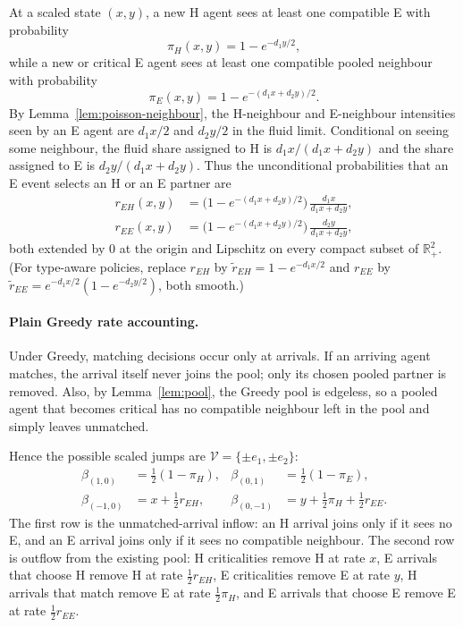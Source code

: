 \documentclass{article}
\theoremstyle{plain}
\theoremstyle{definition}
\begin{document}
At a scaled state $(x,y)$, a new H agent sees at least one compatible E with probability
\[
\pi_H(x,y)=1-e^{-d_1y/2},
\]
while a new or critical E agent sees at least one compatible pooled neighbour with probability
\[
\pi_E(x,y)=1-e^{-(d_1x+d_2y)/2}.
\]
By Lemma~\ref{lem:poisson-neighbour}, the H-neighbour and E-neighbour intensities seen by an E agent are $d_1x/2$ and $d_2y/2$ in the fluid limit. Conditional on seeing some neighbour, the fluid share assigned to H is $d_1x/(d_1x+d_2y)$ and the share assigned to E is $d_2y/(d_1x+d_2y)$. Thus the unconditional probabilities that an E event selects an H or an E partner are
\begin{align*}
r_{EH}(x,y) &= \bigl(1-e^{-(d_1 x+d_2 y)/2}\bigr)\,\frac{d_1 x}{d_1 x+d_2 y},\\
r_{EE}(x,y) &= \bigl(1-e^{-(d_1 x+d_2 y)/2}\bigr)\,\frac{d_2 y}{d_1 x+d_2 y},
\end{align*}
both extended by $0$ at the origin and Lipschitz on every compact subset of $\mathbb{R}_+^2$. (For type-aware policies, replace $r_{EH}$ by $\widetilde r_{EH}=1-e^{-d_1 x/2}$ and $r_{EE}$ by $\widetilde r_{EE}=e^{-d_1 x/2}(1-e^{-d_2 y/2})$, both smooth.)

\paragraph{Plain Greedy rate accounting.}
Under Greedy, matching decisions occur only at arrivals. If an arriving agent matches, the arrival itself never joins the pool; only its chosen pooled partner is removed. Also, by Lemma~\ref{lem:pool}, the Greedy pool is edgeless, so a pooled agent that becomes critical has no compatible neighbour left in the pool and simply leaves unmatched.

Hence the possible scaled jumps are $\mathcal V=\{\pm e_1,\pm e_2\}$:
\begin{align*}
\beta_{(1,0)}&=\tfrac12(1-\pi_H),
&\beta_{(0,1)}&=\tfrac12(1-\pi_E),\\
\beta_{(-1,0)}&=x+\tfrac12 r_{EH},
&\beta_{(0,-1)}&=y+\tfrac12\pi_H+\tfrac12 r_{EE}.
\end{align*}
The first row is the unmatched-arrival inflow: an H arrival joins only if it sees no E, and an E arrival joins only if it sees no compatible neighbour. The second row is outflow from the existing pool: H criticalities remove H at rate $x$, E arrivals that choose H remove H at rate $\tfrac12r_{EH}$, E criticalities remove E at rate $y$, H arrivals that match remove E at rate $\tfrac12\pi_H$, and E arrivals that choose E remove E at rate $\tfrac12r_{EE}$.
\end{document}
